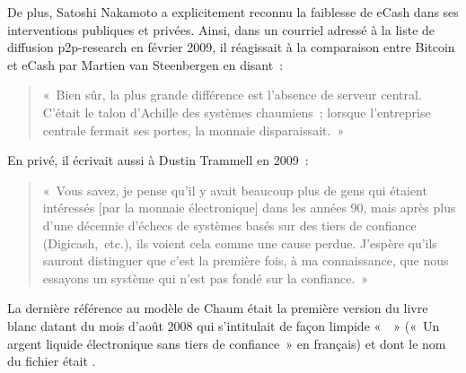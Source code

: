De plus, Satoshi Nakamoto a explicitement reconnu la faiblesse de eCash dans ses interventions publiques et privées. Ainsi, dans un courriel adressé à la liste de diffusion p2p-research en février 2009, il réagissait à la comparaison entre Bitcoin et eCash par Martien van Steenbergen en disant~:

\begin{quote}
«~Bien sûr, la plus grande différence est l'absence de serveur central. C'était le talon d'Achille des systèmes chaumiens~; lorsque l'entreprise centrale fermait ses portes, la monnaie disparaissait.~»
\end{quote} %

En privé, il écrivait aussi à Dustin Trammell en 2009~:

\begin{quote}
«~Vous savez, je pense qu'il y avait beaucoup plus de gens qui étaient intéressés [par la monnaie électronique] dans les années 90, mais après plus d'une décennie d'échecs de systèmes basés sur des tiers de confiance (Digicash,~etc.), ils voient cela comme une cause perdue. J'espère qu'ils sauront distinguer que c'est la première fois, à ma connaissance, que nous essayons un système qui n'est pas fondé sur la confiance.~»
\end{quote}

La dernière référence au modèle de Chaum était la première version du livre blanc datant du mois d'août 2008 qui s'intitulait de façon limpide «~~» («~Un argent liquide électronique sans tiers de confiance~» en français) et dont le nom du fichier était .

